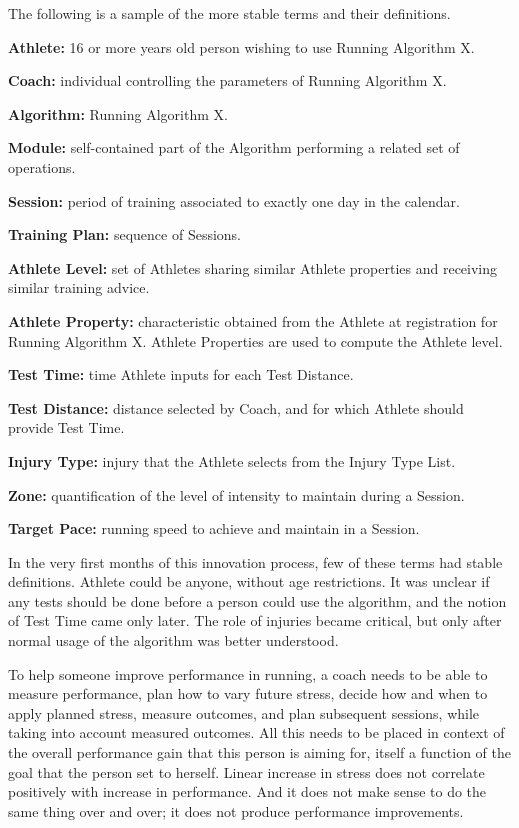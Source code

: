 \documentclass[graybox,envcountchap,sectrefs]{svmono}
\begin{document}
The following is a sample of the more stable terms and their definitions. 

\begin{svgraybox}
\noindent\textbf{Athlete:} 16 or more years old person wishing to use Running Algorithm X.

\noindent\textbf{Coach:} individual controlling the parameters of Running Algorithm X.

\noindent\textbf{Algorithm:} Running Algorithm X.

\noindent\textbf{Module:} self-contained part of the Algorithm performing a related set of operations.

\noindent\textbf{Session:} period of training associated to exactly one day in the calendar.

\noindent\textbf{Training Plan:} sequence of Sessions.

\noindent\textbf{Athlete Level:} set of Athletes sharing similar Athlete properties and receiving similar training advice.

\noindent\textbf{Athlete Property:} characteristic obtained from the Athlete at registration for Running Algorithm X. Athlete Properties are used to compute the Athlete level.

\noindent\textbf{Test Time:} time Athlete inputs for each Test Distance.

\noindent\textbf{Test Distance:} distance selected by Coach, and for which Athlete should provide Test Time.

\noindent\textbf{Injury Type:} injury that the Athlete selects from the Injury Type List.

\noindent\textbf{Zone:} quantification of the level of intensity to maintain during a Session.

\noindent\textbf{Target Pace:} running speed to achieve and maintain in a Session.
\end{svgraybox}

In the very first months of this innovation process, few of these terms had stable definitions. Athlete could be anyone, without age restrictions. It was unclear if any tests should be done before a person could use the algorithm, and the notion of Test Time came only later. The role of injuries became critical, but only after normal usage of the algorithm was better understood. 

To help someone improve performance in running, a coach needs to be able to measure performance, plan how to vary future stress, decide how and when to apply planned stress, measure outcomes, and plan subsequent sessions, while taking into account measured outcomes. All this needs to be placed in context of the overall performance gain that this person is aiming for, itself a function of the goal that the person set to herself. Linear increase in stress does not correlate positively with increase in performance. And it does not make sense to do the same thing over and over; it does not produce performance improvements.
\end{document}
